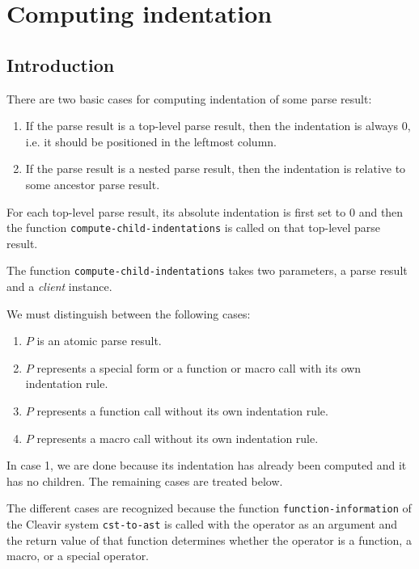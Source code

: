 \section{Computing indentation}
\label{sec-internals-common-lisp-mode-indentation}

\subsection{Introduction}

There are two basic cases for computing indentation of some parse
result:

\begin{enumerate}
\item If the parse result is a top-level parse result, then the
  indentation is always $0$, i.e. it should be positioned in the
  leftmost column.
\item If the parse result is a nested parse result, then the
  indentation is relative to some ancestor parse result.
\end{enumerate}

For each top-level parse result, its absolute indentation is first set
to $0$ and then the function \texttt{compute-child-indentations} is
called on that top-level parse result.

The function \texttt{compute-child-indentations} takes two parameters,
a parse result and a \emph{client} instance.

We must distinguish between the following cases:

\begin{enumerate}
\item $P$ is an atomic parse result.
\item $P$ represents a special form or a function or macro call with
  its own indentation rule.
\item $P$ represents a function call without its own indentation rule.
\item $P$ represents a macro call without its own indentation rule.
\end{enumerate}

In case 1, we are done because its indentation has already been
computed and it has no children.  The remaining cases are treated
below.

The different cases are recognized because the function
\texttt{function-information} of the Cleavir system
\texttt{cst-to-ast} is called with the operator as an argument and the
return value of that function determines whether the operator is a
function, a macro, or a special operator.

